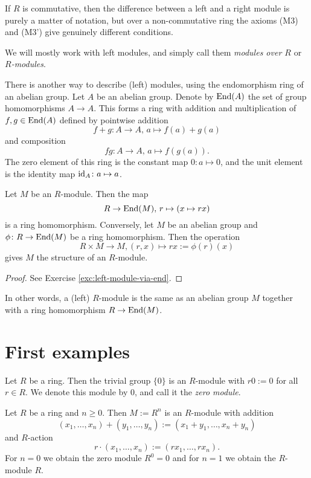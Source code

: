  If $R$ is commutative, then the difference between a left and a right module is purely a matter of notation, but over a non-commutative ring the axioms (M3) and (M3') give  genuinely different conditions.

We will mostly work with left modules, and simply call them \emph{modules over $R$} or \emph{$R$-modules}. 

There is another way to describe (left) modules, using the endomorphism ring of an abelian group.
Let $A$ be an abelian group. Denote by $\operatorname{\mathrm{End}}(A)$ the set of group homomorphisms $A\to A$. This forms a ring with addition and multiplication of $f,g\in \operatorname{\mathrm{End}}(A)$ defined by pointwise addition
\[
	f+g\colon A\to A, \,a \mapsto f(a)+g(a)
\]
and composition
\[
	fg\colon A\to A,\, a\mapsto f(g(a)).
\]
The zero element of this ring is the constant map $0\colon a \mapsto 0$, and the unit element is the identity map ${\rm id}_A\colon a\mapsto a$.


\begin{lemma}\label{lemma:left-module-via-end}
Let $M$ be an $R$-module. Then the map
\[
	R \to \operatorname{\mathrm{End}}(M), \, r \mapsto \left( x \mapsto rx \right)
\]
is a ring homomorphism. Conversely, let $M$ be an abelian group and $\phi\colon R\to \operatorname{\mathrm{End}}(M)$ be a ring homomorphism. Then the operation
\[
	R\times M \to M, (r, x) \mapsto rx:= \phi(r)(x)
\]
gives $M$ the structure of an $R$-module.
\end{lemma}

\begin{proof}See Exercise \ref{exc:left-module-via-end}.
\end{proof}

In other words, a (left) $R$-module is the same as an abelian group $M$ together with a ring homomorphism $R\to \operatorname{\mathrm{End}}(M)$. 




\section{First examples}

\begin{example} Let $R$ be a ring. Then the trivial group $\{0\}$ is an $R$-module with $r0:=0$ for all $r\in R$. We denote this module by $0$, and call it the \emph{zero module}.
\end{example}

\begin{example} Let $R$ be a ring and $n\geq 0$. Then $M:=R^n$ is an $R$-module with addition
\[
	(x_1,\ldots, x_n) + (y_1,\ldots, y_n) := (x_1+y_1, \ldots, x_n+y_n)
\]
and $R$-action
\[
	r\cdot (x_1,\ldots, x_n) := (rx_1,\ldots, rx_n).
\]
For $n=0$ we obtain the zero module $R^0=0$ and for $n=1$ we obtain the $R$-module $R$.
\end{example}

